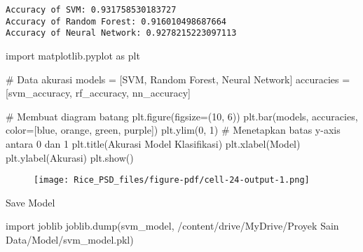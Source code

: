\documentclass[
  letterpaper,
]{krantz}
\makeatletter
\newenvironment{Shaded}{\begin{snugshade}}{\end{snugshade}}
\newcommand{\CommentTok}[1]{\textcolor[rgb]{0.37,0.37,0.37}{#1}}
\newcommand{\DecValTok}[1]{\textcolor[rgb]{0.68,0.00,0.00}{#1}}
\newcommand{\ImportTok}[1]{\textcolor[rgb]{0.00,0.46,0.62}{#1}}
\newcommand{\NormalTok}[1]{\textcolor[rgb]{0.00,0.23,0.31}{#1}}
\newcommand{\OperatorTok}[1]{\textcolor[rgb]{0.37,0.37,0.37}{#1}}
\newcommand{\StringTok}[1]{\textcolor[rgb]{0.13,0.47,0.30}{#1}}
\newenvironment{kframe}{%
\medskip{}
\setlength{\fboxsep}{.8em}
 \def\at@end@of@kframe{}%
 \ifinner\ifhmode%
  \def\at@end@of@kframe{\end{minipage}}%
  \begin{minipage}{\columnwidth}%
 \fi\fi%
 \def\FrameCommand##1{\hskip\@totalleftmargin \hskip-\fboxsep
 \colorbox{shadecolor}{##1}\hskip-\fboxsep
     \hskip-\linewidth \hskip-\@totalleftmargin \hskip\columnwidth}%
 \MakeFramed {\advance\hsize-\width
   \@totalleftmargin\z@ \linewidth\hsize
   \@setminipage}}%
 {\par\unskip\endMakeFramed%
 \at@end@of@kframe}
\renewenvironment{Shaded}{\begin{kframe}}{\end{kframe}}
\makeatother
\begin{document}
\begin{verbatim}
Accuracy of SVM: 0.931758530183727
Accuracy of Random Forest: 0.916010498687664
Accuracy of Neural Network: 0.9278215223097113
\end{verbatim}

\begin{Shaded}
\begin{Highlighting}[]
\ImportTok{import}\NormalTok{ matplotlib.pyplot }\ImportTok{as}\NormalTok{ plt}

\CommentTok{\# Data akurasi}
\NormalTok{models }\OperatorTok{=}\NormalTok{ [}\StringTok{\textquotesingle{}SVM\textquotesingle{}}\NormalTok{, }\StringTok{\textquotesingle{}Random Forest\textquotesingle{}}\NormalTok{, }\StringTok{\textquotesingle{}Neural Network\textquotesingle{}}\NormalTok{]}
\NormalTok{accuracies }\OperatorTok{=}\NormalTok{ [svm\_accuracy, rf\_accuracy, nn\_accuracy]}

\CommentTok{\# Membuat diagram batang}
\NormalTok{plt.figure(figsize}\OperatorTok{=}\NormalTok{(}\DecValTok{10}\NormalTok{, }\DecValTok{6}\NormalTok{))}
\NormalTok{plt.bar(models, accuracies, color}\OperatorTok{=}\NormalTok{[}\StringTok{\textquotesingle{}blue\textquotesingle{}}\NormalTok{, }\StringTok{\textquotesingle{}orange\textquotesingle{}}\NormalTok{, }\StringTok{\textquotesingle{}green\textquotesingle{}}\NormalTok{, }\StringTok{\textquotesingle{}purple\textquotesingle{}}\NormalTok{])}
\NormalTok{plt.ylim(}\DecValTok{0}\NormalTok{, }\DecValTok{1}\NormalTok{)  }\CommentTok{\# Menetapkan batas y{-}axis antara 0 dan 1}
\NormalTok{plt.title(}\StringTok{\textquotesingle{}Akurasi Model Klasifikasi\textquotesingle{}}\NormalTok{)}
\NormalTok{plt.xlabel(}\StringTok{\textquotesingle{}Model\textquotesingle{}}\NormalTok{)}
\NormalTok{plt.ylabel(}\StringTok{\textquotesingle{}Akurasi\textquotesingle{}}\NormalTok{)}
\NormalTok{plt.show()}
\end{Highlighting}
\end{Shaded}

\begin{figure}[H]

{\centering \texttt{[image: Rice\_PSD\_files/figure-pdf/cell-24-output-1.png]}

}

\end{figure}

Save Model

\begin{Shaded}
\begin{Highlighting}[]
\ImportTok{import}\NormalTok{ joblib}
\NormalTok{joblib.dump(svm\_model, }\StringTok{\textquotesingle{}/content/drive/MyDrive/Proyek Sain Data/Model/svm\_model.pkl\textquotesingle{}}\NormalTok{)}
\end{Highlighting}
\end{Shaded}
\end{document}
